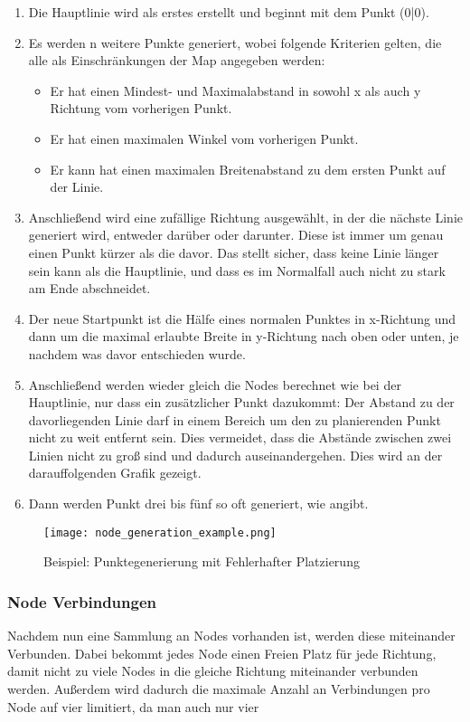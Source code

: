 \begin{enumerate}
    \item Die Hauptlinie wird als erstes erstellt und beginnt mit dem Punkt (0|0).
    \item Es werden n weitere Punkte generiert, wobei folgende Kriterien gelten, die alle als Einschränkungen der Map angegeben werden:
    \begin{itemize}
        \item Er hat einen Mindest- und Maximalabstand in sowohl x als auch y Richtung vom vorherigen Punkt.
        \item Er hat einen maximalen Winkel vom vorherigen Punkt.
        \item Er kann hat einen maximalen Breitenabstand zu dem ersten Punkt auf der Linie.
    \end{itemize}
    \item Anschließend wird eine zufällige Richtung ausgewählt, in der die nächste Linie generiert wird, entweder darüber oder darunter.
    Diese ist immer um genau einen Punkt kürzer als die davor.
    Das stellt sicher, dass keine Linie länger sein kann als die Hauptlinie, und dass es im Normalfall auch nicht zu stark am Ende abschneidet.
    \item Der neue Startpunkt ist die Hälfe eines normalen Punktes in x-Richtung und dann um die maximal erlaubte Breite in y-Richtung nach oben oder unten, je nachdem was davor entschieden wurde.
    \item Anschließend werden wieder gleich die Nodes berechnet wie bei der Hauptlinie, nur dass ein zusätzlicher Punkt dazukommt:
    Der Abstand zu der davorliegenden Linie darf in einem Bereich um den zu planierenden Punkt nicht zu weit entfernt sein.
    Dies vermeidet, dass die Abstände zwischen zwei Linien nicht zu groß sind und dadurch auseinandergehen.
    Dies wird an der darauffolgenden Grafik gezeigt.
    \item Dann werden Punkt drei bis fünf so oft generiert, wie  angibt.
\end{enumerate}


\begin{figure}[H]
    \centering
    \texttt{[image: node\_generation\_example.png]}
    \caption{Beispiel: Punktegenerierung mit Fehlerhafter Platzierung }
\end{figure}


\subsubsection{Node Verbindungen}\label{subsubsec:node-verbindungen}
Nachdem nun eine Sammlung an Nodes vorhanden ist, werden diese miteinander Verbunden.
Dabei bekommt jedes Node einen Freien Platz für jede Richtung, damit nicht zu viele Nodes in die gleiche Richtung miteinander verbunden werden.
Außerdem wird dadurch die maximale Anzahl an Verbindungen pro Node auf vier limitiert, da man auch nur vier